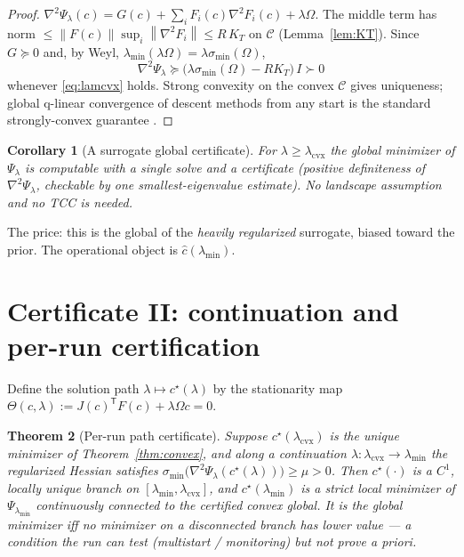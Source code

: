 \documentclass[11pt]{article}
\theoremstyle{plain}
\newtheorem{theorem}{Theorem}[section]
\newtheorem{corollary}[theorem]{Corollary}
\theoremstyle{definition}
\theoremstyle{remark}
\newcommand{\norm}[1]{\left\lVert#1\right\rVert}
\newcommand{\trc}{\mathsf{T}}
\begin{document}
\begin{proof}
$\nabla^{2}\Psi_\lambda(c)=G(c)+\sum_{i}F_i(c)\nabla^{2}F_i(c)
+\lambda\Omega$. The middle term has norm
$\le\norm{F(c)}\sup_i\norm{\nabla^{2}F_i}\le R\,K_T$ on $\mathcal C$
(Lemma~\ref{lem:KT}). Since $G\succeq0$ and, by Weyl,
$\lambda_{\min}(\lambda\Omega)=\lambda\sigma_{\min}(\Omega)$,
\[
\nabla^{2}\Psi_\lambda \succeq
\big(\lambda\sigma_{\min}(\Omega)-RK_T\big)\,I \succ 0
\]
whenever \eqref{eq:lamcvx} holds. Strong convexity on the convex
$\mathcal C$ gives uniqueness; global q-linear convergence of descent
methods from any start is the standard strongly-convex guarantee
\cite[Ch.~2]{nesterov2004}.
\end{proof}

\begin{corollary}[A surrogate global certificate]\label{cor:surr}
For $\lambda\ge\lambda_{\mathrm{cvx}}$ the global minimizer of
$\Psi_\lambda$ is computable with a \emph{single} solve and a
\emph{certificate} (positive definiteness of $\nabla^{2}\Psi_\lambda$,
checkable by one smallest-eigenvalue estimate). No landscape assumption
and no TCC is needed.
\end{corollary}

The price: this is the global of the \emph{heavily regularized} surrogate,
biased toward the prior. The operational object is
$\hat c(\lambda_{\min})$.

\section{Certificate II: continuation and per-run certification}
\label{sec:path}

Define the solution path $\lambda\mapsto c^\star(\lambda)$ by the
stationarity map
$\Theta(c,\lambda):=J(c)^{\trc}F(c)+\lambda\Omega c=0$.

\begin{theorem}[Per-run path certificate]\label{thm:path}
Suppose $c^\star(\lambda_{\mathrm{cvx}})$ is the unique minimizer of
Theorem~\ref{thm:convex}, and along a continuation
$\lambda:\lambda_{\mathrm{cvx}}\to\lambda_{\min}$ the regularized Hessian
satisfies $\sigma_{\min}\big(\nabla^{2}\Psi_\lambda(c^\star(\lambda))\big)
\ge\mu>0$. Then $c^\star(\cdot)$ is a $C^{1}$, locally unique branch on
$[\lambda_{\min},\lambda_{\mathrm{cvx}}]$, and $c^\star(\lambda_{\min})$
is a strict local minimizer of $\Psi_{\lambda_{\min}}$ continuously
connected to the certified convex global. It is \emph{the} global
minimizer iff no minimizer on a disconnected branch has lower value ---
a condition the run can \emph{test} (multistart / monitoring) but not
\emph{prove} a priori.
\end{theorem}
\end{document}
